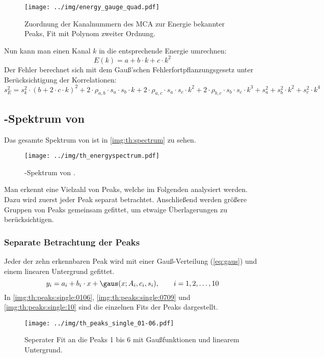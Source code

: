 \begin{figure}[H]
\begin{center}
  \texttt{[image: ../img/energy\_gauge\_quad.pdf]}
  \caption{Zuordnung der Kanalnummern des MCA zur Energie bekannter Peaks,
  Fit mit Polynom zweiter Ordnung.}
  \label{img:gauge:quad}
\end{center}
\end{figure}
Nun kann man einen Kanal $k$ in die entsprechende Energie umrechnen:
\begin{equation}
  \label{eq:energygauge}
  E(k) = a + b \cdot k + c \cdot k^2
\end{equation}
Der Fehler berechnet sich mit dem Gauß'schen Fehlerfortpflanzungsgesetz unter Berücksichtigung der Korrelationen:
\begin{equation}
	\label{eq:energygauge:error}
  s_E^2 = s_{k}^2 \cdot (b + 2 \cdot c \cdot k)^2 + 2 \cdot \rho_{a, b} \cdot s_{a} \cdot s_{b} \cdot k + 2 \cdot \rho_{a, c} \cdot s_{a} \cdot s_{c} \cdot k^2 +
  2 \cdot \rho_{b, c} \cdot s_{b} \cdot s_{c} \cdot k^3 + s_{a}^2 + s_{b}^2 \cdot k^2 + s_{c}^2 \cdot k^4
\end{equation}

\subsection{\textgamma-Spektrum von \th}
Das gesamte Spektrum von \th ist in \autoref{img:th:spectrum} zu sehen.
\begin{figure}[H]
\begin{center}
  \texttt{[image: ../img/th\_energyspectrum.pdf]}
  \caption{\textgamma-Spektrum von \th.}
  \label{img:th:spectrum}
\end{center}
\end{figure}
Man erkennt eine Vielzahl von Peaks, welche im Folgenden analysiert werden. Dazu wird zuerst jeder Peak separat betrachtet. Anschließend werden 
größere Gruppen von Peaks gemeinsam gefittet, um etwaige Überlagerungen zu berücksichtigen.

\subsubsection{Separate Betrachtung der Peaks}
Jeder der zehn erkennbaren Peak wird mit einer Gauß-Verteilung (\autoref{eq:gaus}) und einem linearen Untergrund gefittet.
\begin{equation}
  y_i = a_i + b_i \cdot x + \gaus(x; A_i, c_i, s_i), \qquad i=1, 2, \ldots, 10
\end{equation}
In \autoref{img:th:peaks:single:0106}, \autoref{img:th:peaks:single:0709} und \autoref{img:th:peaks:single:10} sind die einzelnen Fits der Peaks 
dargestellt.
\begin{figure}[H]
\begin{center}
  \texttt{[image: ../img/th\_peaks\_single\_01-06.pdf]}
  \caption{Seperater Fit an die Peaks 1 bis 6 mit Gaußfunktionen und linearem Untergrund.}
  \label{img:th:peaks:single:0106}
\end{center}
\end{figure}

